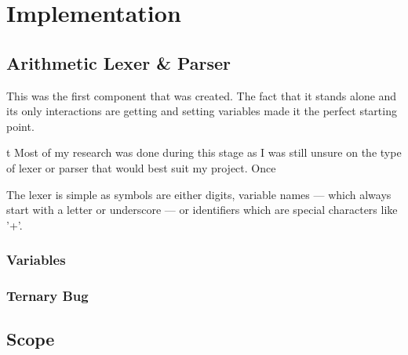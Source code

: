 \chapter{Implementation}




\section{Arithmetic Lexer \& Parser}
This was the first component that was created.
The fact that it stands alone and its only interactions are getting and setting variables made it the perfect starting point.

t
Most of my research was done during this stage as I was still unsure on the type of lexer or parser that would best suit my project.
Once 

The lexer is simple as symbols are either digits, variable names --- which always start with a letter or underscore --- or identifiers which are special characters like '+'.





\subsection{Variables}
\subsection{Ternary Bug}

\section{Scope}

